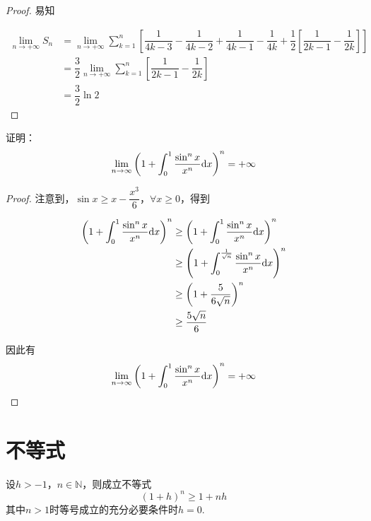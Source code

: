 \begin{proof}

    易知
    
    \begin{align*}
        \lim\limits_{n \to +\infty } S_{n} & =  \lim\limits_{n \to +\infty} \sum\limits_{k = 1}^{n} \left[ \dfrac{1}{4k - 3} - \dfrac{1}{4k - 2} + \dfrac{1}{4k - 1} - \dfrac{1}{4k}  + \dfrac{1}{2} \left[ \dfrac{1}{2k - 1} - \dfrac{1}{2k} \right] \right] \\
        & = \dfrac{3}{2} \lim\limits_{n \to + \infty} \sum\limits_{k = 1}^{n}  \left[  \dfrac{1}{2k - 1} -\dfrac{1}{2k} \right] \\
        & = \dfrac{3}{2} \ln 2
    \end{align*}

\end{proof}

\begin{proposition}

    证明：
    $$\lim\limits_{n \to \infty}{\left( 1 + \int_{0}^{1}{\dfrac{\sin^n{x}}{x^n}}\mathrm{d} x \right)^n} = + \infty$$

\end{proposition}

\begin{proof}

    注意到，$\sin{x} \geq x - \dfrac{x^3}{6}$，$\forall x \geq 0$，得到

    \begin{align*}
        \left( 1 + \int_{0}^{1}{\dfrac{\sin^n{x}}{x^n}}\mathrm{d} x \right)^n & \geq \left( 1 + \int_{0}^{1}{\dfrac{\sin^n x}{x^n}}\mathrm{d} x \right)^n \\
        & \geq \left( 1 + \int_{0}^{\frac{1}{\sqrt{n}}}{\dfrac{\sin^n{x}}{x^n}}\mathrm{d} x \right)^n \\
        & \geq \left( 1 + \dfrac{5}{6\sqrt{n}} \right)^n \\
        & \geq \dfrac{5\sqrt{n}}{6}
    \end{align*}

    因此有
    $$\lim\limits_{n \to \infty}{\left( 1 + \int_{0}^{1}{\dfrac{\sin^n{x}}{x^n}}\mathrm{d} x \right)^n} = + \infty$$

\end{proof}

\section{不等式}

\begin{theorem}[Bernoulli不等式]

    设$h > -1$，$n \in \mathbb{N}$，则成立不等式
    $$(1 + h)^n \geq 1 + nh$$
    其中$n > 1$时等号成立的充分必要条件时$h = 0$.

\end{theorem}

